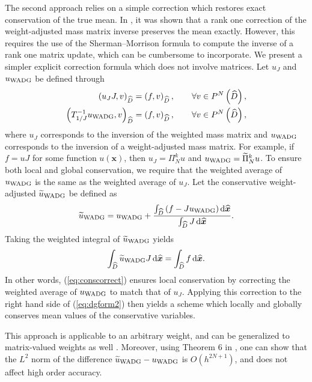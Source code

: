 \documentclass[10pt]{amsart}
\theoremstyle{definition}
\theoremstyle{lemma}
\theoremstyle{theorem}
\theoremstyle{assumption}
\renewcommand{\hat}{\widehat}
\renewcommand{\tilde}{\widetilde}
\newcommand{\LRp}[1]{\left( #1 \right)}
\newcommand*\diff[1]{\mathop{}\!{\mathrm{d}#1}} %
\begin{document}
{The second approach relies on a simple correction which restores exact conservation of the true mean.  In \cite{chan2016weight2}, it was shown that a rank one correction of the weight-adjusted mass matrix inverse preserves the mean exactly.  However, this requires the use of the Sherman--Morrison formula to compute the inverse of a rank one matrix update, which can be cumbersome to incorporate.  We present a simpler explicit correction formula which does not involve matrices.  Let $u_J$ and $u_{\rm WADG}$ be defined through 
\begin{align*}
\LRp{u_J J,v}_{\hat{D}} &= \LRp{f,v}_{\hat{D}}, \qquad \forall v \in P^N\LRp{\hat{D}},\\
\LRp{T_{1/J}^{-1}u_{\rm WADG},v}_{\hat{D}} &= \LRp{f,v}_{\hat{D}}, \qquad \forall v \in P^N\LRp{\hat{D}},
\end{align*}
where $u_J$ corresponds to the inversion of the weighted mass matrix and $u_{\rm WADG}$ corresponds to the inversion of a weight-adjusted mass matrix.  For example, if $f = u J$ for some function $u(\bm{x})$, then $u_J = \Pi^k_N u$ and $u_{\rm WADG} = \tilde{\Pi}^k_N u$.  To ensure both local and global conservation, we require that the weighted average of $u_{\rm WADG}$ is the same as the weighted average of $u_J$.  Let the conservative weight-adjusted $\tilde{u}_{\rm WADG}$ be defined as
\begin{equation}
  \tilde{u}_{\rm WADG} = u_{\rm WADG} + \frac{\int_{\hat{D}} \left(f  - J u_{\rm WADG}\right)\diff{\hat{\bm{x}}}}{\int_{\hat{D}} J \diff{\hat{\bm{x}}}}.  
  \label{eq:conscorrect}
\end{equation}
Taking the weighted integral of $\tilde{u}_{\rm WADG}$ yields
\[
  \int_{\hat{D}}\tilde{u}_{\rm WADG}J \diff{\hat{\bm{x}}} = \int_{\hat{D}} f \diff{\hat{\bm{x}}}.
\]
In other words, (\ref{eq:conscorrect}) ensures local conservation by correcting the weighted average of $u_{\rm WADG}$ to match that of $u_J$.  Applying this correction to the right hand side of (\ref{eq:dgform2}) then yields a scheme which locally and globally conserves mean values of the conservative variables.

This approach is applicable to an arbitrary weight, and can be generalized to matrix-valued weights as well \cite{chan2017weight}.  Moreover, using Theorem 6 in \cite{chan2016weight1}, one can show that the $L^2$ norm of the difference $\tilde{u}_{\rm WADG} - u_{\rm WADG}$ is $O(h^{2N+1})$, and does not affect high order accuracy.  

}
\end{document}
